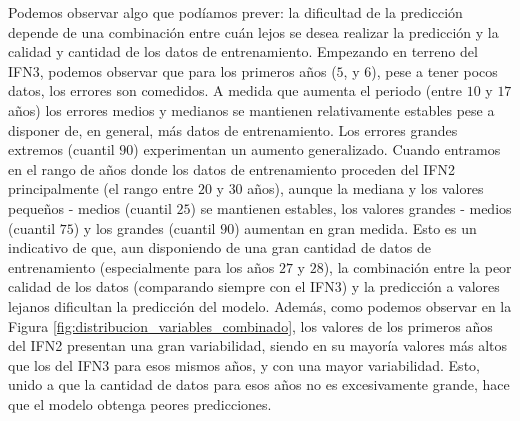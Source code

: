
Podemos observar algo que podíamos prever: la dificultad de la predicción depende de una combinación entre cuán lejos se desea realizar la predicción y la calidad y cantidad de los datos de entrenamiento. Empezando en terreno del IFN3, podemos observar que para los primeros años ($5$, y $6$), pese a tener pocos datos, los errores son comedidos. A medida que aumenta el periodo (entre $10$ y $17$ años) los errores medios y medianos se mantienen relativamente estables pese a disponer de, en general, más datos de entrenamiento. Los errores grandes extremos (cuantil $90$) experimentan un aumento generalizado. Cuando entramos en el rango de años donde los datos de entrenamiento proceden del IFN2 principalmente (el rango entre $20$ y $30$ años), aunque la mediana y los valores pequeños - medios (cuantil $25$) se mantienen estables, los valores grandes - medios (cuantil $75$) y los grandes (cuantil $90$) aumentan en gran medida. Esto es un indicativo de que, aun disponiendo de una gran cantidad de datos de entrenamiento (especialmente para los años $27$ y $28$), la combinación entre la peor calidad de los datos (comparando siempre con el IFN3) y la predicción a valores lejanos dificultan la predicción del modelo. Además, como podemos observar en la Figura \ref{fig:distribucion_variables_combinado}, los valores de los primeros años del IFN2 presentan una gran variabilidad, siendo en su mayoría valores más altos que los del IFN3 para esos mismos años, y con una mayor variabilidad. Esto, unido a que la cantidad de datos para esos años no es excesivamente grande, hace que el modelo obtenga peores predicciones.

